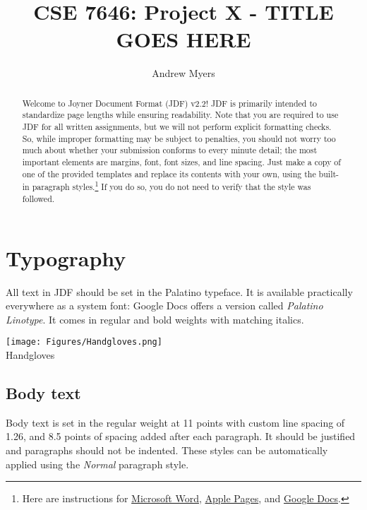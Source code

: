 \documentclass[
	letterpaper, %
]{jdf}
\author{Andrew Myers}
\title{CSE 7646: Project X - TITLE GOES HERE}
\begin{document}

\maketitle

\begin{abstract}
	Welcome to Joyner Document Format (JDF) v2.2! JDF is primarily intended to standardize page lengths while ensuring readability. 
	Note that you are required to use JDF for all written assignments, but we will not perform explicit formatting checks. 
	So, while improper formatting may be subject to penalties, you should not worry too much about whether your submission conforms to 
	every minute detail; the most important elements are margins, font, font sizes, and line spacing. Just make a copy of one of the provided templates 
	and replace its contents with your own, using the built-in paragraph styles.\footnote{Here are instructions for 
	\href{https://support.office.com/en-us/article/Video-Using-Styles-in-Word-9db4c0f4-2754-4294-9758-c14a0abd8cfa}{Microsoft Word}, 
	\href{https://support.apple.com/guide/pages/intro-to-paragraph-styles-tanaa39b0aa3/mac}{Apple Pages}, and 
	\href{https://www.bazroberts.com/2016/04/19/google-docs-paragraph-styles-headings/}{Google Docs}.} If you do so, you do not need to verify that the style was followed.
\end{abstract}

\section{Typography}
All text in JDF should be set in the Palatino typeface. It is available practically everywhere as a system font: Google Docs offers a version 
called \emph{Palatino Linotype}. It comes in regular and bold weights with matching italics.

\begin{jdffigure}
\texttt{[image: Figures/Handgloves.png]} \\
{\huge Handgloves}%
\label{fig:Palatino}%
\end{jdffigure}

\subsection{Body text}
Body text is set in the regular weight at 11 points with custom line spacing of 1.26, and 8.5 points of spacing added after each paragraph. It should be justified 
and paragraphs should not be indented. These styles can be automatically applied using the \emph{Normal} paragraph style.
\end{document}
